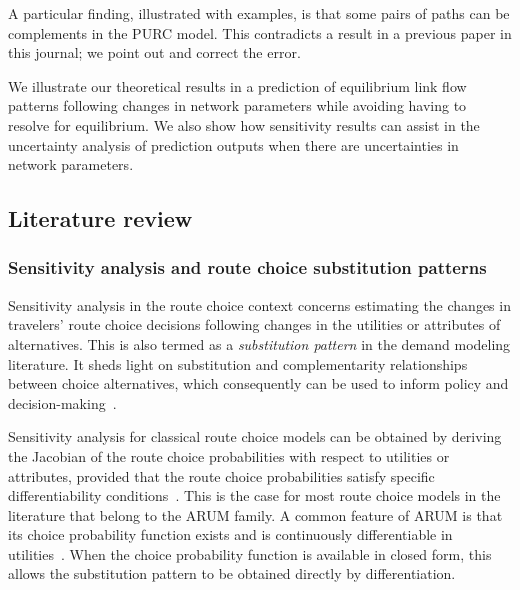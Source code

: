 \documentclass[a4paper,11pt]{article}
\begin{document}
A particular finding, illustrated with examples, is that some pairs of paths can be complements in the PURC model. This contradicts a result in a previous paper in this journal; we point out and correct the error.

We illustrate our theoretical results in a prediction of equilibrium link flow patterns following changes in network parameters while avoiding having to resolve for equilibrium. We also show how sensitivity results can assist in the uncertainty analysis of prediction outputs when there are uncertainties in network parameters.


\subsection{Literature review}
\subsubsection{Sensitivity analysis and route choice substitution patterns }
Sensitivity analysis in the route choice context concerns estimating the changes in travelers' route choice decisions following changes in the utilities or attributes of alternatives. This is also termed as a \textit{substitution pattern} in the demand modeling literature. It sheds light on substitution and complementarity relationships between choice alternatives, which consequently can be used to inform policy and decision-making~\citep{ben1985discrete}. 

Sensitivity analysis for classical route choice models can be obtained by deriving the Jacobian of the route choice probabilities with respect to utilities or attributes, provided that the route choice probabilities satisfy specific differentiability conditions~\citep{robinson_strongly_1980, robinson1985implicit}. This is the case for most route choice models in the literature that belong to the ARUM family. 
A common feature of ARUM is that its choice probability function exists and is continuously differentiable in utilities~\citep{mcfadden_econometric_1981,Fosgerau2013y}. When the choice probability function is available in closed form, this allows the substitution pattern to be obtained directly by differentiation. %
\end{document}
